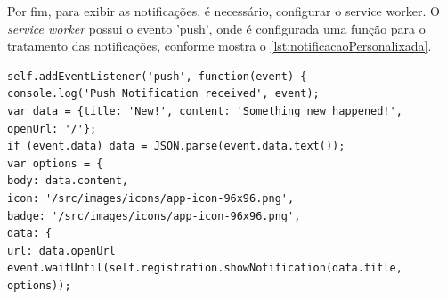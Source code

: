 Por fim, para exibir as notificações, é necessário, configurar o service worker. O \textit{service worker} possui o evento 'push', onde é configurada uma função para o tratamento das notificações, conforme mostra o \autoref{lst:notificacaoPersonalixada}.
\begin{lstlisting}[frame=single,label=lst:notificacaoPersonalixada,caption= Notificação personalizada, basicstyle=\footnotesize]
self.addEventListener('push', function(event) {
console.log('Push Notification received', event);
var data = {title: 'New!', content: 'Something new happened!', openUrl: '/'};
if (event.data) data = JSON.parse(event.data.text());
var options = {
body: data.content,
icon: '/src/images/icons/app-icon-96x96.png',
badge: '/src/images/icons/app-icon-96x96.png',
data: {
url: data.openUrl
event.waitUntil(self.registration.showNotification(data.title, options));
\end{lstlisting}
\vspace{-0.62cm}
\begin{center}
\end{center}